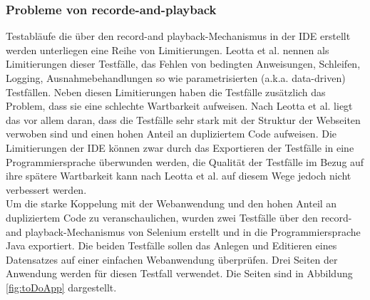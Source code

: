\subsubsection{Probleme von recorde-and-playback}
\label{sec:probleme_von_recorde_and_playback}
Testabläufe die über den \grq record-and playback\grq -Mechanismus in der IDE erstellt werden unterliegen eine Reihe von Limitierungen. Leotta et al. \cite{leotta_repairing_2013} nennen als Limitierungen dieser Testfälle, das Fehlen von bedingten Anweisungen, Schleifen, Logging, Ausnahmebehandlungen so wie parametrisierten (a.k.a. data-driven) Testfällen.
Neben diesen Limitierungen haben die Testfälle zusätzlich das Problem, dass sie eine schlechte Wartbarkeit aufweisen. Nach Leotta et al. \cite{leotta_repairing_2013} liegt das vor allem daran, dass die Testfälle sehr stark mit der Struktur der Webseiten verwoben sind und einen hohen Anteil an dupliziertem Code aufweisen.
Die Limitierungen der IDE können zwar durch das Exportieren der Testfälle in eine Programmiersprache überwunden werden, die Qualität der Testfälle im Bezug auf ihre spätere Wartbarkeit kann nach  Leotta et al. \cite{leotta_repairing_2013} auf diesem Wege jedoch nicht verbessert werden.\\
Um die starke Koppelung mit der Webanwendung und den hohen Anteil an dupliziertem Code zu veranschaulichen, wurden zwei Testfälle über den \grq record-and playback\grq -Mechanismus von Selenium erstellt und in die Programmiersprache Java exportiert.
Die beiden Testfälle sollen das Anlegen und Editieren eines Datensatzes auf einer einfachen Webanwendung überprüfen.
Drei Seiten der Anwendung werden für diesen Testfall verwendet. Die Seiten sind in Abbildung \ref{fig:toDoApp} dargestellt.

